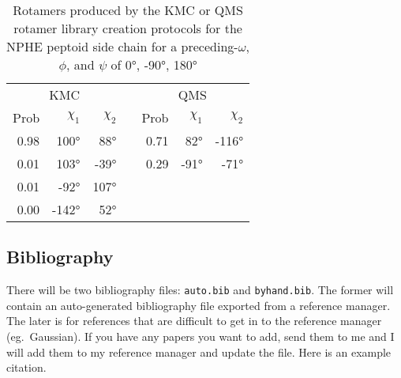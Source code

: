 \begin{table}
  \centering
  \caption{Rotamers produced by the KMC or QMS rotamer library creation protocols for the NPHE peptoid side chain for a preceding-$\omega$, $\phi$, and $\psi$ of \ang{0}, \ang{-90}, \ang{180}}
  \label{supptbl:rot_lib_snpshot_nmeo}
  \begin{tabular}{rrrcrrr}
    \toprule
    \multicolumn{3}{c}{KMC} && \multicolumn{3}{c}{QMS} \\
    \cmidrule{1-3} \cmidrule{5-7}
    Prob & $\chi_1$  & $\chi_2$ && Prob & $\chi_1$  & $\chi_2$ \\
    \midrule
    0.98 & \ang{100}  &  \ang{88}  && 0.71 & \ang{82}  &  \ang{-116} \\
    0.01 & \ang{103}  &  \ang{-39} && 0.29 & \ang{-91} &  \ang{-71}  \\
    0.01 & \ang{-92}  &  \ang{107} && ~ & ~ & ~ \\
    0.00 & \ang{-142} &  \ang{52}  && ~ & ~ & ~ \\
    \bottomrule
  \end{tabular}
\end{table}

\subsection{Bibliography}
There will be two bibliography files: \texttt{auto.bib} and \texttt{byhand.bib}.
The former will contain an auto-generated bibliography file exported from a reference manager.
The later is for references that are difficult to get in to the reference manager (eg.~Gaussian).
If you have any papers you want to add, send them to me and I will add them to my reference manager and update the file.
Here is an example citation\cite{jacak_computational_2012}.
